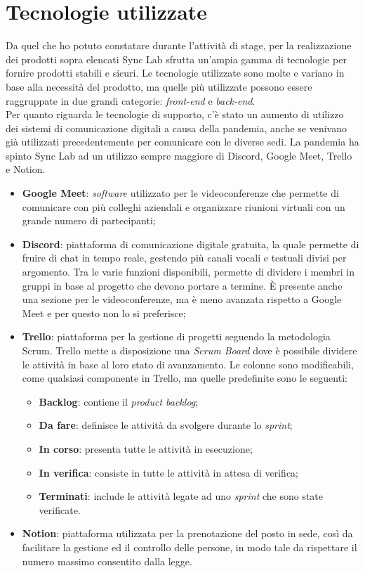 \section{Tecnologie utilizzate}
Da quel che ho potuto constatare durante l'attività di stage, per la realizzazione dei prodotti sopra elencati Sync Lab sfrutta un'ampia gamma di tecnologie per fornire prodotti stabili e sicuri. Le tecnologie utilizzate sono molte e variano in base alla necessità del prodotto, ma quelle più utilizzate possono essere raggruppate in due grandi categorie: \emph{front-end} e \emph{back-end}. \\

Per quanto riguarda le tecnologie di supporto, c'è stato un aumento di utilizzo dei sistemi di comunicazione digitali a causa della pandemia, anche se venivano già utilizzati precedentemente per comunicare con le diverse sedi. La pandemia ha spinto Sync Lab ad un utilizzo sempre maggiore di Discord, Google Meet, Trello e Notion.

\begin{itemize}
  \item \textbf{Google Meet}: \emph{software} utilizzato per le videoconferenze che permette di comunicare con più colleghi aziendali e organizzare riunioni virtuali con un grande numero di partecipanti;
  \item \textbf{Discord}: piattaforma di comunicazione digitale gratuita, la quale permette di fruire di chat in tempo reale, gestendo più canali vocali e testuali divisi per argomento. Tra le varie funzioni disponibili, permette di dividere i membri in gruppi in base al progetto che devono portare a termine. È presente anche una sezione per le videoconferenze, ma è meno avanzata rispetto a Google Meet e per questo non lo si preferisce;
  \item \textbf{Trello}: piattaforma per la gestione di progetti seguendo la metodologia Scrum. Trello mette a disposizione una \emph{Scrum Board} dove è possibile dividere le attività in base al loro stato di avanzamento. Le colonne sono modificabili, come qualsiasi componente in Trello, ma quelle predefinite sono le seguenti:
  \begin{itemize}
    \item \textbf{Backlog}: contiene il \emph{product backlog};
    \item \textbf{Da fare}: definisce le attività da svolgere durante lo \emph{sprint};
    \item \textbf{In corso}: presenta tutte le attività in esecuzione;
    \item \textbf{In verifica}: consiste in tutte le attività in attesa di verifica;
    \item \textbf{Terminati}: include le attività legate ad uno \emph{sprint} che sono state verificate. 
  \end{itemize}
  \item \textbf{Notion}: piattaforma utilizzata per la prenotazione del posto in sede, così da facilitare la gestione ed il controllo delle persone, in modo tale da rispettare il numero massimo consentito dalla legge.
\end{itemize}

